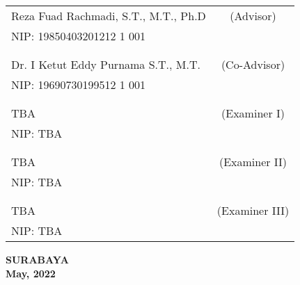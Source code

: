     \noindent
    \begin{tabularx}{\textwidth}{X c}
      Reza Fuad Rachmadi, S.T., M.T., Ph.D          & (Advisor) \\
      NIP: 19850403201212 1 001      & \\
      &  \\
      &  \\
      Dr. I Ketut Eddy Purnama S.T., M.T.    & (Co-Advisor) \\
      NIP: 19690730199512 1 001        & \\
      &  \\
      &  \\
      TBA  & (Examiner I) \\
      NIP: TBA        & \\
      &  \\
      &  \\
      TBA  & (Examiner II) \\
      NIP: TBA        & \\
      &  \\
      &  \\
      TBA             & (Examiner III) \\
      NIP: TBA        & \\
    \end{tabularx}
  \endgroup


  \vspace{8ex}

  \begin{center}
    \textbf{SURABAYA} \\
    \textbf{May, 2022}
  \end{center}
\endgroup
